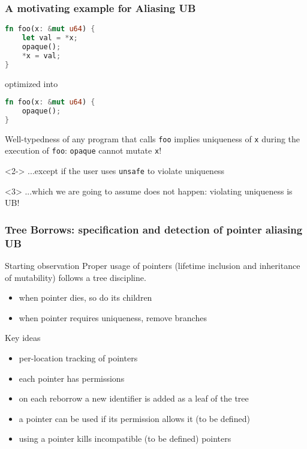 \begin{frame}[fragile, t]
    \frametitle{A motivating example for Aliasing UB}
    \begin{lstlisting}[language=rust]
fn foo(x: &mut u64) {
    let val = *x;
    opaque();
    *x = val;
}
    \end{lstlisting}
    optimized into
    \begin{lstlisting}[language=rust]
fn foo(x: &mut u64) {
    opaque();
}
    \end{lstlisting}
    Well-typedness of any program that calls \texttt{foo} implies uniqueness
    of \texttt{x} during the execution of \texttt{foo}: \texttt{opaque} cannot mutate \texttt{x}!\\
    \begin{onlyenv}<2->
    ...except if the user uses \texttt{unsafe} to violate uniqueness \\
    \end{onlyenv}
    \begin{onlyenv}<3>
    ...which we are going to assume does not happen: violating uniqueness is UB!
    \end{onlyenv}
\end{frame}

\begin{frame}[t]
    \frametitle{Tree Borrows: specification and detection of pointer aliasing UB}
    \begin{alertblock}{Starting observation}
        Proper usage of pointers (lifetime inclusion and inheritance of mutability) follows a tree discipline.
        \begin{itemize}
            \item when pointer dies, so do its children
            \item when pointer requires uniqueness, remove branches
        \end{itemize}
    \end{alertblock}
    \begin{block}{Key ideas}
        \begin{itemize}
            \item per-location tracking of pointers
            \item each pointer has permissions
            \item on each reborrow a new identifier is added as a leaf of the tree
            \item a pointer can be used if its permission allows it (to be defined)
            \item using a pointer kills incompatible (to be defined) pointers
        \end{itemize}
    \end{block}
\end{frame}

